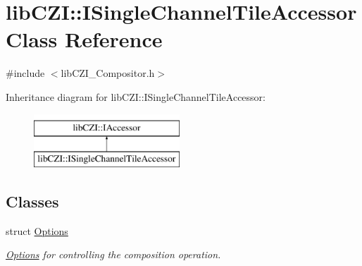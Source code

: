 \hypertarget{classlib_c_z_i_1_1_i_single_channel_tile_accessor}{}\section{lib\+C\+ZI\+:\+:I\+Single\+Channel\+Tile\+Accessor Class Reference}
\label{classlib_c_z_i_1_1_i_single_channel_tile_accessor}


{\ttfamily \#include $<$lib\+C\+Z\+I\+\_\+\+Compositor.\+h$>$}

Inheritance diagram for lib\+C\+ZI\+:\+:I\+Single\+Channel\+Tile\+Accessor\+:\begin{figure}[H]
\begin{center}
\leavevmode
\includegraphics[height=2.000000cm]{classlib_c_z_i_1_1_i_single_channel_tile_accessor}
\end{center}
\end{figure}
\subsection*{Classes}
\begin{DoxyCompactItemize}
\item 
struct \hyperlink{structlib_c_z_i_1_1_i_single_channel_tile_accessor_1_1_options}{Options}
\begin{DoxyCompactList}\small\item\em \hyperlink{structlib_c_z_i_1_1_i_single_channel_tile_accessor_1_1_options}{Options} for controlling the composition operation. \end{DoxyCompactList}\end{DoxyCompactItemize}
